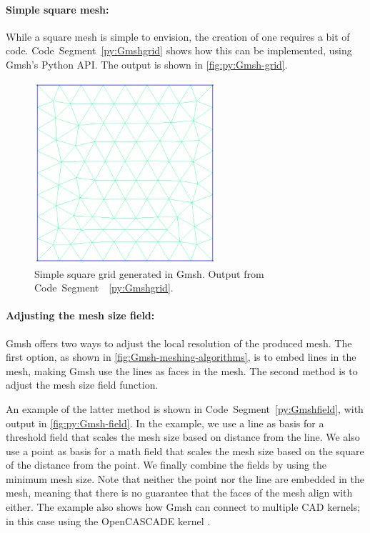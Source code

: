 \paragraph{Simple square mesh:}
While a square mesh is simple to envision, the creation of one requires a bit of code. Code~Segment~\ref{py:Gmshgrid} shows how this can be implemented, using Gmsh's Python API. The output is shown in \autoref{fig:py:Gmsh-grid}.


\begin{figure}[tp]
    \centering
    \includegraphics[width=0.6\textwidth]{report/Images/Software/Gmsh examples/gmsh_square_mesh.png}
    \caption[Simple square grid generated in Gmsh]{Simple square grid generated in Gmsh. Output from Code~Segment~~\ref{py:Gmshgrid}.}
    \label{fig:py:Gmsh-grid}
\end{figure}


\paragraph{Adjusting the mesh size field:}
Gmsh offers two ways to adjust the local resolution of the produced mesh. The first option, as shown in \autoref{fig:Gmsh-meshing-algorithms}, is to embed lines in the mesh, making Gmsh use the lines as faces in the mesh. The second method is to adjust the mesh size field function.

An example of the latter method is shown in Code~Segment~\ref{py:Gmshfield}, with output in \autoref{fig:py:Gmsh-field}. In the example, we use a line as basis for a threshold field that scales the mesh size based on distance from the line. We also use a point as basis for a math field that scales the mesh size based on the square of the distance from the point. We finally combine the fields by using the minimum mesh size. Note that neither the point nor the line are embedded in the mesh, meaning that there is no guarantee that the faces of the mesh align with either. The example also shows how Gmsh can connect to multiple CAD kernels; in this case using the OpenCASCADE kernel \cite{Gmsh_reference}.

